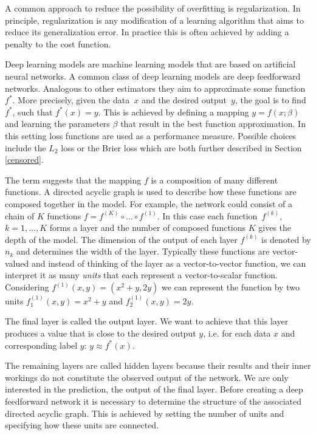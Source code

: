 \documentclass[12pt, a4paper]{scrartcl}
\theoremstyle{definition}
\theoremstyle{plain}
\numberwithin{equation}{section}
\numberwithin{figure}{section}
\numberwithin{table}{section}
\begin{document}
	A common approach to reduce the possibility of overfitting is regularization.
	In principle, regularization is any modification of a learning algorithm that aims to reduce its generalization error.
	In practice this is often achieved by adding a penalty to the cost function.
	
	Deep learning models are machine learning models that are based on artificial neural networks.
	A common class of deep learning models are deep feedforward networks. Analogous to other estimators they aim to approximate some function~$f^*$.
	More precisely, given the data~$x$ and the desired output~$y$, the goal is to find $f^*$, such that $f^*(x)=y$.
	This is achieved by defining a mapping $y = f(x; \beta)$ and learning the parameters $\beta$ that result in the best function approximation.
	In this setting loss functions are used as a performance measure.
	Possible choices include the $L_2$ loss or the Brier loss which are both further described in Section \ref{censored}.
	
	The term  suggests that the mapping $f$ is a composition of many different functions.
	A directed acyclic graph is used to describe how these functions are composed together in the model.
	For example, the network could consist of a chain of $K$ functions $ f = f^{(K)}\circ \dots \circ f^{(1)}$.
	In this case each function~$f^{(k)}$, $k=1,\dots,K$ forms a layer and the number of composed functions $K$ gives the depth of the model.
	The dimension of the output of each layer $f^{(k)}$ is denoted by $n_k$ and determines the width of the layer.
	Typically these functions are vector-valued and instead of thinking of the layer as a vector-to-vector function, we can interpret it as many \emph{units} that each represent a vector-to-scalar function.
	Considering $f^{(1)}(x,y)= (x^2+y,2y)$ we can represent the function by two units $f^{(1)}_1 (x,y) = x^2+y$ and $f^{(1)}_2(x,y) = 2y$.
	
	The final layer is called the output layer.
	We want to achieve that this layer produces a value that is close to the desired output $y$, i.e. for each data $x$ and corresponding label $y$: $y \approx f^*(x)$.
	
	The remaining layers are called hidden layers because their results and their inner workings do not constitute the observed output of the network.
	We are only interested in the prediction, the output of the final layer.
	Before creating a deep feedforward network it is necessary to determine the structure of the associated directed acyclic graph.
	This is achieved by setting the number of units and specifying how these units are connected.
	
\end{document}
